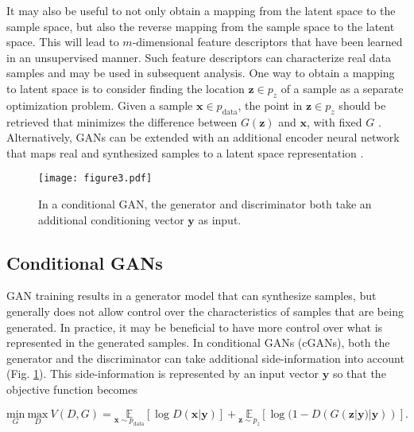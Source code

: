 \documentclass{article}
\begin{document}
It may also be useful to not only obtain a mapping from the latent space to the sample space, but also the reverse mapping from the sample space to the latent space. This will lead to $m$-dimensional feature descriptors that have been learned in an unsupervised manner. Such feature descriptors can characterize real data samples and may be used in subsequent analysis. One way to obtain a mapping to latent space is to consider finding the location $\mathbf{z} \in p_z$ of a sample as a separate optimization problem. Given a sample $\mathbf{x}\in p_{\text{data}}$, the point in $\mathbf{z}\in p_z$ should be retrieved that minimizes the difference between $G(\mathbf{z})$ and $\mathbf{x}$, with fixed $G$ \cite{Lipt17}. Alternatively, GANs can be extended with an additional encoder neural network that maps real and synthesized samples to a latent space representation \cite{Dona16}. 


\begin{figure}[tp]
\centering
\texttt{[image: figure3.pdf]}
\caption{In a conditional GAN, the generator and discriminator both take an additional conditioning vector $\mathbf{y}$ as input.}
\label{fig:cGAN}
\end{figure}

\subsection{Conditional GANs}
GAN training results in a generator model that can synthesize samples, but generally does not allow control over the characteristics of samples that are being generated. 
In practice, it may be beneficial to have more control over what is represented in the generated samples. In conditional GANs (cGANs), both the generator and the discriminator can take additional side-information into account \cite{Mirz14} (Fig. \ref{fig:cGAN}). This side-information is represented by an input vector $\mathbf{y}$ so that the objective function becomes


\begin{equation}
\underset{G}{\text{min}}~\underset{D}{\text{max}}~V(D,G)=\underset{\mathbf{x}\sim p_{\text{data}}}{\mathds{E}} [\log{D(\mathbf{x}|\mathbf{y})}]+\underset{\mathbf{z}\sim p_z}{\mathds{E}} [\log{(1-D(G(\mathbf{z}|\mathbf{y})|\mathbf{y}))}].
\label{eq:cGAN}
\end{equation}
\end{document}
